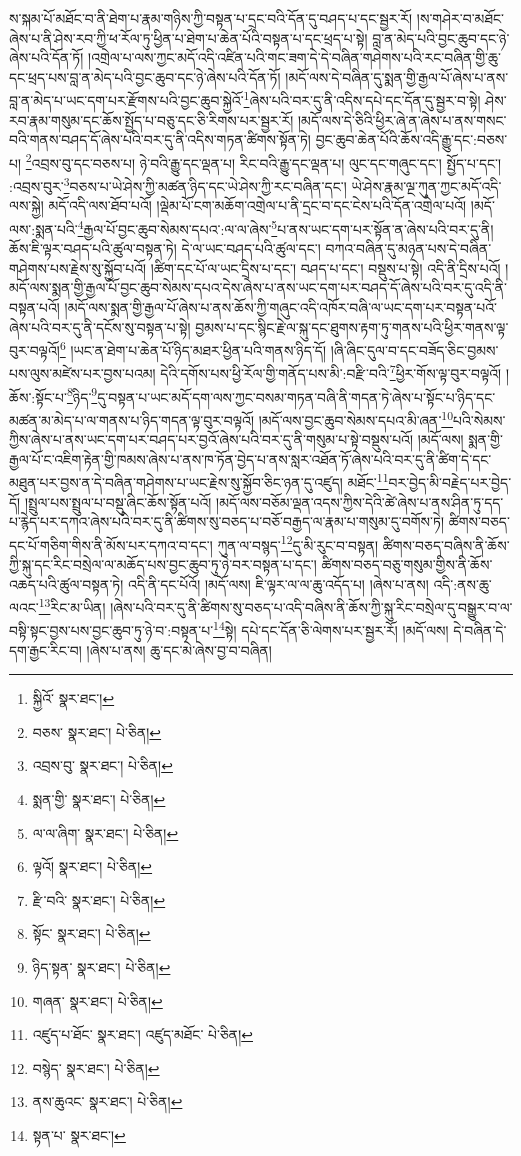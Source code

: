 ས་སྐམ་པོ་མཐོང་བ་ནི་ཐེག་པ་རྣམ་གཉིས་ཀྱི་བསྟན་པ་དྲང་བའི་དོན་དུ་བཤད་པ་དང་སྦྱར་རོ། །ས་གཤེར་བ་མཐོང་ཞེས་པ་ནི་ཤེས་རབ་ཀྱི་ཕ་རོལ་ཏུ་ཕྱིན་པ་ཐེག་པ་ཆེན་པོའི་བསྟན་པ་དང་ཕྲད་པ་སྟེ། བླ་ན་མེད་པའི་བྱང་ཆུབ་དང་ཉེ་ཞེས་པའི་དོན་ཏོ། །འགྲེལ་པ་ལས་ཀྱང་མདོ་འདི་འཛིན་པའི་གང་ཟག་དེ་དེ་བཞིན་གཤེགས་པའི་རང་བཞིན་གྱི་ཆུ་དང་ཕྲད་པས་བླ་ན་མེད་པའི་བྱང་ཆུབ་དང་ཉེ་ཞེས་པའི་དོན་ཏོ། །མདོ་ལས་དེ་བཞིན་དུ་སྨན་གྱི་རྒྱལ་པོ་ཞེས་པ་ནས་བླ་ན་མེད་པ་ཡང་དག་པར་རྫོགས་པའི་བྱང་ཆུབ་སྐྱེའོ་\footnote{སྐྱིའོ་  སྣར་ཐང་། }ཞེས་པའི་བར་དུ་ནི་འདིས་དཔེ་དང་དོན་དུ་སྦྱར་བ་སྟེ། ཤེས་རབ་རྣམ་གསུམ་དང་ཆོས་སྤྱོད་པ་བཅུ་དང་ཅི་རིགས་པར་སྦྱར་རོ། །མདོ་ལས་དེ་ཅིའི་ཕྱིར་ཞེ་ན་ཞེས་པ་ནས་གསང་བའི་གནས་བཤད་དོ་ཞེས་པའི་བར་དུ་ནི་འདིས་གཏན་ཚིགས་སྟོན་ཏེ། བྱང་ཆུབ་ཆེན་པོའི་ཆོས་འདི་རྒྱུ་དང་:བཅས་པ། \footnote{བཅས་  སྣར་ཐང་།  པེ་ཅིན། }འབྲས་བུ་དང་བཅས་པ། ཉེ་བའི་རྒྱུ་དང་ལྡན་པ། རིང་བའི་རྒྱུ་དང་ལྡན་པ། ལུང་དང་གཞུང་དང་། སྤྱོད་པ་དང་། :འབྲས་བུར་\footnote{འབྲས་བུ་  སྣར་ཐང་།  པེ་ཅིན། }བཅས་པ་ཡེ་ཤེས་ཀྱི་མཚན་ཉིད་དང་ཡེ་ཤེས་ཀྱི་རང་བཞིན་དང་། ཡེ་ཤེས་རྣམ་ལྔ་ཀུན་ཀྱང་མདོ་འདི་ལས་སྐྱེ། མདོ་འདི་ལས་ཐོབ་པའོ། །ལྡེམ་པོ་ངག་མཆོག་འགྲེལ་པ་ནི་དྲང་བ་དང་ངེས་པའི་དོན་འགྲེལ་པའོ། །མདོ་ལས་:སྨན་པའི་\footnote{སྨན་གྱི་  སྣར་ཐང་།  པེ་ཅིན། }རྒྱལ་པོ་བྱང་ཆུབ་སེམས་དཔའ་:ལ་ལ་ཞེས་\footnote{ལ་ལ་ཞིག་  སྣར་ཐང་།  པེ་ཅིན། }པ་ནས་ཡང་དག་པར་སྟོན་ན་ཞེས་པའི་བར་དུ་ནི། ཆོས་ཇི་ལྟར་བཤད་པའི་ཚུལ་བསྟན་ཏེ། དེ་ལ་ཡང་བཤད་པའི་ཚུལ་དང་། བཀའ་བཞིན་དུ་མཉན་པས་དེ་བཞིན་གཤེགས་པས་རྗེས་སུ་སྐྱོབ་པའོ། །ཚིག་དང་པོ་ལ་ཡང་དྲིས་པ་དང་། བཤད་པ་དང་། བསྡུས་པ་སྟེ། འདི་ནི་དྲིས་པའོ། །མདོ་ལས་སྨན་གྱི་རྒྱལ་པོ་བྱང་ཆུབ་སེམས་དཔའ་དེས་ཞེས་པ་ནས་ཡང་དག་པར་བཤད་དོ་ཞེས་པའི་བར་དུ་འདི་ནི་བསྟན་པའོ། །མདོ་ལས་སྨན་གྱི་རྒྱལ་པོ་ཞེས་པ་ནས་ཆོས་ཀྱི་གཞུང་འདི་འཁོར་བཞི་ལ་ཡང་དག་པར་བསྟན་པའོ་ཞེས་པའི་བར་དུ་ནི་དངོས་སུ་བསྟན་པ་སྟེ། བྱམས་པ་དང་སྙིང་རྗེ་ལ་སྐུ་དང་ཐུགས་རྟག་ཏུ་གནས་པའི་ཕྱིར་གནས་ལྟ་བུར་བལྟའོ།\footnote{ལྟའོ།  སྣར་ཐང་།  པེ་ཅིན། } །ཡང་ན་ཐེག་པ་ཆེན་པོ་ཉིད་མཐར་ཕྱིན་པའི་གནས་ཉིད་དོ། །ཞི་ཞིང་དུལ་བ་དང་བཟོད་ཅིང་བྱམས་པས་ལུས་མཛེས་པར་བྱས་པའམ། དེའི་དགོས་པས་ཕྱི་རོལ་གྱི་གནོད་པས་མི་:བརྫི་བའི་\footnote{རྫི་བའི་  སྣར་ཐང་།  པེ་ཅིན། }ཕྱིར་གོས་ལྟ་བུར་བལྟའོ། །ཆོས་:སྟོང་པ་\footnote{སྟོང་  སྣར་ཐང་།  པེ་ཅིན། }ཉིད་\footnote{ཉིད་སྟན་  སྣར་ཐང་།  པེ་ཅིན། }དུ་བསྟན་པ་ཡང་མདོ་དག་ལས་ཀྱང་བསམ་གཏན་བཞི་ནི་གདན་ཏེ་ཞེས་པ་སྟོང་པ་ཉིད་དང་མཚན་མ་མེད་པ་ལ་གནས་པ་ཉིད་གདན་ལྟ་བུར་བལྟའོ། །མདོ་ལས་བྱང་ཆུབ་སེམས་དཔའ་མི་ཞན་\footnote{གཞན་  སྣར་ཐང་།  པེ་ཅིན། }པའི་སེམས་ཀྱིས་ཞེས་པ་ནས་ཡང་དག་པར་བཤད་པར་བྱའོ་ཞེས་པའི་བར་དུ་ནི་གསུམ་པ་སྟེ་བསྡུས་པའོ། །མདོ་ལས། སྨན་གྱི་རྒྱལ་པོ་ང་འཇིག་རྟེན་གྱི་ཁམས་ཞེས་པ་ནས་ཁ་ཏོན་བྱེད་པ་ནས་སླར་འཐོན་ཏོ་ཞེས་པའི་བར་དུ་ནི་ཚིག་དེ་དང་མཐུན་པར་བྱས་ན་དེ་བཞིན་གཤེགས་པ་ཡང་རྗེས་སུ་སྐྱོབ་ཅིང་ཉན་དུ་འཛུད། མཐོང་\footnote{འཛུད་པ་ཐོང་  སྣར་ཐང་། འཛུད་མཐོང་  པེ་ཅིན། }བར་བྱེད་མི་བརྗེད་པར་བྱེད་དོ། །སྤྲུལ་པས་སྤྲུལ་པ་བསྡུ་ཞིང་ཆོས་སྟོན་པའོ། །མདོ་ལས་བཅོམ་ལྡན་འདས་ཀྱིས་དེའི་ཚེ་ཞེས་པ་ནས་ཤིན་ཏུ་དད་པ་རྙེད་པར་དཀའ་ཞེས་པའི་བར་དུ་ནི་ཚིགས་སུ་བཅད་པ་བཅོ་བརྒྱད་ལ་རྣམ་པ་གསུམ་དུ་བགོས་ཏེ། ཚིགས་བཅད་དང་པོ་གཅིག་གིས་ནི་མོས་པར་དཀའ་བ་དང་། ཀུན་ལ་བསྙད་\footnote{བསྙེད་  སྣར་ཐང་།  པེ་ཅིན། }དུ་མི་རུང་བ་བསྟན། ཚིགས་བཅད་བཞིས་ནི་ཆོས་ཀྱི་སྐུ་དང་རིང་བསྲེལ་ལ་མཆོད་པས་བྱང་ཆུབ་ཏུ་ཉེ་བར་བསྟན་པ་དང་། ཚིགས་བཅད་བཅུ་གསུམ་གྱིས་ནི་ཆོས་འཆད་པའི་ཚུལ་བསྟན་ཏེ། འདི་ནི་དང་པོའོ། །མདོ་ལས། ཇི་ལྟར་ལ་ལ་ཆུ་འདོད་པ། །ཞེས་པ་ནས། འདི་:ནས་ཆུ་ལའང་\footnote{ནས་ཆུའང་  སྣར་ཐང་།  པེ་ཅིན། }རིང་མ་ཡིན། །ཞེས་པའི་བར་དུ་ནི་ཚིགས་སུ་བཅད་པ་འདི་བཞིས་ནི་ཆོས་ཀྱི་སྐུ་རིང་བསྲེལ་དུ་བསྒྱུར་བ་ལ་བསྟི་སྟང་བྱས་པས་བྱང་ཆུབ་ཏུ་ཉེ་བ་:བསྟན་པ་\footnote{སྟན་པ་  སྣར་ཐང་། }སྟེ། དཔེ་དང་དོན་ཅི་ལེགས་པར་སྦྱར་རོ། །མདོ་ལས། དེ་བཞིན་དེ་དག་རྒྱང་རིང་བ། །ཞེས་པ་ནས། ཆུ་དང་མེ་ཞེས་བྱ་བ་བཞིན། 